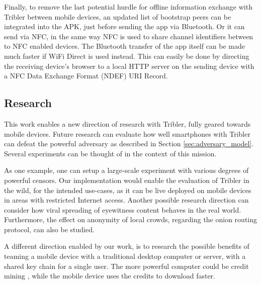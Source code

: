 Finally, to remove the last potential hurdle for offline information exchange with Tribler between mobile devices, an updated list of bootstrap peers can be integrated into the APK, just before sending the app via Bluetooth.
Or it can send via NFC, in the same way NFC is used to share channel identifiers between to NFC enabled devices.
The Bluetooth transfer of the app itself can be made much faster if WiFi Direct is used instead.
This can easily be done by directing the receiving device's browser to a local HTTP server on the sending device with a NFC Data Exchange Format (NDEF) URI Record.


\subsection{Research}\label{subsec:research}
This work enables a new direction of research with Tribler, fully geared towards mobile devices.
Future research can evaluate how well smartphones with Tribler can defeat the powerful adversary as described in Section \ref{sec:adversary_model}.
Several experiments can be thought of in the context of this mission.

As one example, one can setup a large-scale experiment with various degrees of powerful censors.
Our implementation would enable the evaluation of Tribler in the wild, for the intended use-cases, as it can be live deployed on mobile devices in areas with restricted Internet access.
Another possible research direction can consider how viral spreading of eyewitness content behaves in the real world.
Furthermore, the effect on anonymity of local crowds, regarding the onion routing protocol, can also be studied.

A different direction enabled by our work, is to research the possible benefits of teaming a mobile device with a traditional desktop computer or server, with a shared key chain for a single user.
The more powerful computer could be credit mining \cite{decentralized_credit_mining}, while the mobile device uses the credits to download faster.

